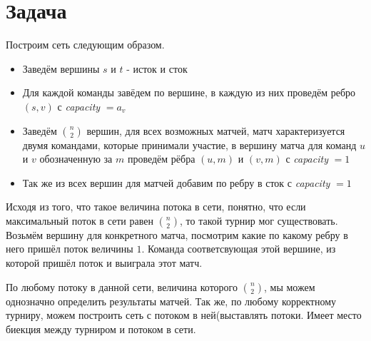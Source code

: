 \documentclass{article}
\theoremstyle{plain}
\theoremstyle{remark}
\theoremstyle{definition}
\begin{document}
\section*{Задача }
    Построим сеть следующим образом.
    \begin{itemize}
        \item Заведём вершины $s$ и $t$ - исток и сток
        \item Для каждой команды завёдем по вершине, в каждую из них проведём ребро $(s, v)$ с \textit{capacity} $ = a_v$
        \item Заведём $\binom{n}{2}$ вершин, для всех возможных матчей, матч характеризуется двумя командами, которые принимали участие,  в вершину матча для команд $u$ и $v$ обозначенную за $m$ проведём рёбра $(u, m)$ и $(v, m)$ с \textit{capacity} $ = 1$
        \item Так же из всех вершин для матчей добавим по ребру в сток с \textit{capacity} $ = 1$
    \end{itemize}
    Исходя из того, что такое величина потока в сети, понятно, что если максимальный поток в сети равен $\binom{n}{2}$, то такой турнир мог существовать. Возьмём вершину для конкретного матча, посмотрим какие по какому ребру в него пришёл поток величины $1$. Команда соответсвующая этой вершине, из которой пришёл поток и выиграла этот матч. 
    
    По любому потоку в данной сети, величина которого $\binom{n}{2}$, мы можем однозначно определить результаты матчей. Так же, по любому корректному турниру, можем построить сеть с потоком в ней(выставлять потоки. Имеет место биекция между турниром и потоком в сети.
\end{document}

